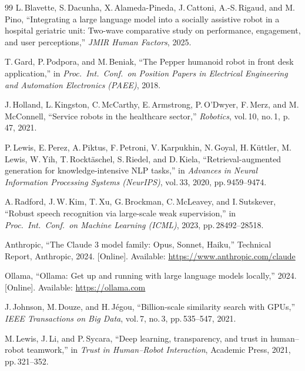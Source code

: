 \documentclass[conference]{IEEEtran}
\begin{document}
\begin{thebibliography}{99}
L.\,Blavette, S.\,Dacunha, X.\,Alameda-Pineda, J.\,Cattoni, A.-S.\,Rigaud, and M.\,Pino,
``Integrating a large language model into a socially assistive robot in a hospital
geriatric unit: Two-wave comparative study on performance, engagement, and user
perceptions,''
\emph{JMIR Human Factors}, 2025.

T.\,Gard, P.\,Podpora, and M.\,Beniak,
``The Pepper humanoid robot in front desk application,''
in \emph{Proc.\ Int.\ Conf.\ on Position Papers in Electrical Engineering and
Automation Electronics (PAEE)}, 2018.

J.\,Holland, L.\,Kingston, C.\,McCarthy, E.\,Armstrong, P.\,O'Dwyer, F.\,Merz,
and M.\,McConnell,
``Service robots in the healthcare sector,''
\emph{Robotics}, vol.\,10, no.\,1, p.\,47, 2021.

P.\,Lewis, E.\,Perez, A.\,Piktus, F.\,Petroni, V.\,Karpukhin, N.\,Goyal,
H.\,K\"{u}ttler, M.\,Lewis, W.\,Yih, T.\,Rockt\"{a}schel, S.\,Riedel,
and D.\,Kiela,
``Retrieval-augmented generation for knowledge-intensive NLP tasks,''
in \emph{Advances in Neural Information Processing Systems (NeurIPS)}, vol.\,33,
2020, pp.\,9459--9474.

A.\,Radford, J.\,W.\,Kim, T.\,Xu, G.\,Brockman, C.\,McLeavey, and I.\,Sutskever,
``Robust speech recognition via large-scale weak supervision,''
in \emph{Proc.\ Int.\ Conf.\ on Machine Learning (ICML)}, 2023,
pp.\,28492--28518.

Anthropic,
``The Claude 3 model family: Opus, Sonnet, Haiku,''
Technical Report, Anthropic, 2024.
[Online]. Available: \url{https://www.anthropic.com/claude}

Ollama,
``Ollama: Get up and running with large language models locally,''
2024. [Online]. Available: \url{https://ollama.com}

J.\,Johnson, M.\,Douze, and H.\,J\'{e}gou,
``Billion-scale similarity search with GPUs,''
\emph{IEEE Transactions on Big Data}, vol.\,7, no.\,3, pp.\,535--547, 2021.

M.\,Lewis, J.\,Li, and P.\,Sycara,
``Deep learning, transparency, and trust in human--robot teamwork,''
in \emph{Trust in Human--Robot Interaction}, Academic Press, 2021,
pp.\,321--352.

\end{thebibliography}
\end{document}
